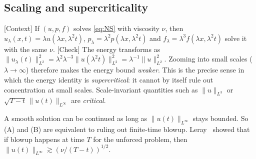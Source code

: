 \documentclass[11pt]{article}
\theoremstyle{plain}
\theoremstyle{remark}
\newcommand{\chk}{\textsf{\small[Check]}}
\newcommand{\ctx}{\textsf{\small[Context]}}
\begin{document}
\subsection{Scaling and supercriticality}
\ctx{} If $(u,p,f)$ solves \eqref{eq:NS} with viscosity $\nu$, then
$u_\lambda(x,t)=\lambda u(\lambda x,\lambda^2t)$, $p_\lambda=\lambda^2p(\lambda x,\lambda^2 t)$ and $f_\lambda=\lambda^3 f(\lambda x,\lambda^2t)$ solve it with the same $\nu$.
\chk{} The energy transforms as $\|u_\lambda(t)\|_{L^2}^2=\lambda^{2}\lambda^{-3}\|u(\lambda^2t)\|_{L^2}^2=\lambda^{-1}\|u\|_{L^2}^2$. Zooming into small scales ($\lambda\to\infty$) therefore makes the energy bound \emph{weaker}. This is the precise sense in which the energy identity is \emph{supercritical}: it cannot by itself rule out concentration at small scales. Scale-invariant quantities such as $\|u\|_{L^3}$ or $\sqrt{T-t}\,\|u(t)\|_{L^\infty}$ are \emph{critical}.

A smooth solution can be continued as long as $\|u(t)\|_{L^\infty}$ stays bounded. So (A) and (B) are equivalent to ruling out finite-time blowup. Leray~\cite{Leray} showed that if blowup happens at time $T$ for the unforced problem, then $\|u(t)\|_{L^\infty}\gtrsim (\nu/(T-t))^{1/2}$.
\end{document}
